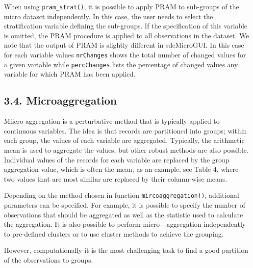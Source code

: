 \documentclass[]{article}
\begin{document}
When using \texttt{pram\_strat()}, it is possible
to apply PRAM to sub-groups of the micro datasct independently. In this case,
the user needs to select the stratiﬁcation variable deﬁning the sub-groups. If
the speciﬁcation of this variable is omitted, the PRAM procedure is applied to
all observations in the dataset. We note that the output of PRAM is slightly
different in sdcMicroGUI. In this case for each variable values \texttt{nrChanges} shows
the total number of changed values for a given variable while \texttt{percChanges} lists the
percentage of changed values any variable for which PRAM has been applied.
\subsection*{3.4. Microaggregation}
Miicro-aggregation is a perturbative method that is typically applied to continuous
variables. The idea is that records are partitioned into groups; within each group,
the values of each variable are aggregated. Typically, the arithmetic mean is used
to aggregate the values, but other robust methods are also possible. Individual
values of the records for each variable are replaced by the group aggregation value,
which is often the mean; as an example, see Table 4, where two values that are
most similar are replaced by their column-wise means.

Depending on the method chosen in function \texttt{mircoaggregation()}, additional
parameters can be speciﬁed. For example, it is possible to specify the number of
observations that should be aggregated as well as the statistic used to calculate
the aggregation. It is also possible to perform micro—aggregation independently to
pre-deﬁned clusters or to use cluster methods to achieve the grouping.

However, computationally it is the most challenging task to ﬁnd a good partition
of the observations to groups. 
\end{document}
